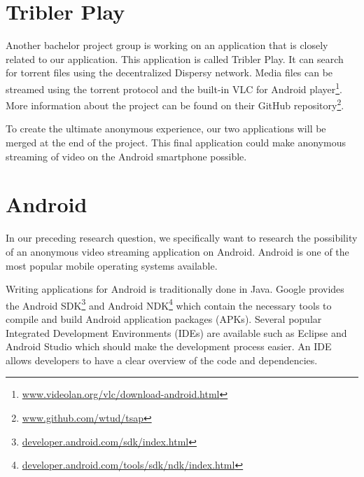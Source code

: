 	\section{Tribler Play}
	\label{sec:triblerplay}
		Another bachelor project group is working on an application that is closely related to our application. This application is called Tribler Play. It can search for torrent files using the decentralized Dispersy network. Media files can be streamed using the torrent protocol and the built-in VLC for Android player\footnote{\href{http://www.videolan.org/vlc/download-android.html}{www.videolan.org/vlc/download-android.html}}. More information about the project can be found on their GitHub repository\footnote{\href{https://github.com/wtud/tsap}{www.github.com/wtud/tsap}}.
		
		To create the ultimate anonymous experience, our two applications will be merged at the end of the project. This final application could make anonymous streaming of video on the Android smartphone possible.
		
	\section{Android}
		In our preceding research question, we specifically want to research the possibility of an anonymous video streaming application on Android. Android is one of the most popular mobile operating systems available. 
		
		Writing applications for Android is traditionally done in Java. Google provides the Android SDK\footnote{\href{http://developer.android.com/sdk/index.html}{developer.android.com/sdk/index.html}} and Android NDK\footnote{\href{https://developer.android.com/tools/sdk/ndk/index.html}{developer.android.com/tools/sdk/ndk/index.html}} which contain the necessary tools to compile and build Android application packages (APKs). Several popular Integrated Development Environments (IDEs) are available such as Eclipse and Android Studio which should make the development process easier. An IDE allows developers to have a clear overview of the code and dependencies.